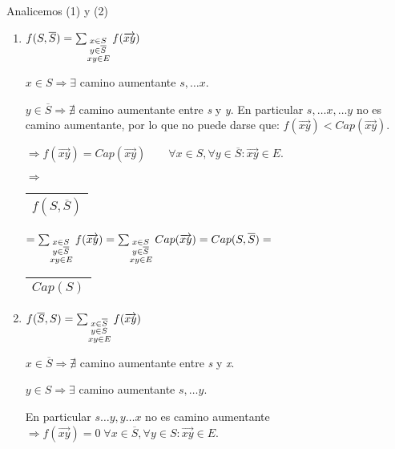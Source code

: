 \documentclass[12pt,a4paper]{report}
\begin{document}
					\vspace{2mm}
					\par Analicemos (1) y (2)
					\begin{enumerate}[(1)]
						\item $f(S, \overline{S}) = \sum_{\begin{subarray}{l} \; x \in S \\
							\; y \in \overline{S} \\ xy \in E\end{subarray}} f(\overrightarrow{xy}) $
							\par $x \in S \Rightarrow \exists$ camino aumentante $ s, \dotsc x$.
							\par $y \in \overline{S} \Rightarrow \nexists$ camino aumentante entre \textit{s} y \textit{y}. En particular $s, \dotsc x, \dotsc y$ no es camino aumentante, por lo que no puede darse que: $f(\overrightarrow{xy}) < Cap(\overrightarrow{xy})$.

							\vspace{3mm}
							\par $\Rightarrow f(\overrightarrow{xy}) = Cap(\overrightarrow{xy}) \qquad \forall x \in S, \forall y \in \overline{S} : \overrightarrow{xy} \in E.$

							\vspace{3mm}
							\par $\Rightarrow$ \begin{tabular}{|c|} \hline $f(S, \overline{S})$ \\\hline \end{tabular} $= \sum_{\begin{subarray}{l} \; x \in S\\  \; y \in \overline{S} \\ xy \in E\end{subarray}} f(\overrightarrow{xy}) = \sum_{\begin{subarray}{l} \; x \in S\\  \; y \in \overline{S} \\ xy \in E\end{subarray}} Cap(\overrightarrow{xy}) = Cap(S, \overline{S}) =$ \begin{tabular}{|c|} \hline $ Cap(S) $ \\ \hline \end{tabular}

						\item $f(\overline{S}, S) = \sum_{\begin{subarray}{l} \; x \in \overline{S} \\
							\; y \in S \\ xy \in E\end{subarray}} f(\overrightarrow{xy}) $
							\par $x \in \overline{S} \Rightarrow \nexists$ camino aumentante entre \textit{s} y \textit{x}.
							\par $y \in S \Rightarrow \exists$ camino aumentante $ s, \dotsc y$.
							\par En particular $s \dotsc y, y \dotsc x$ no es camino aumentante $\Rightarrow f(\overrightarrow{xy}) = 0  \; \forall x \in \overline{S}, \forall y \in S : \overrightarrow{xy} \in E$.


\end{enumerate}
\end{document}
